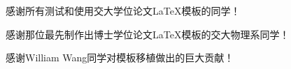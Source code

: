 
\begin{thanks}

  感谢所有测试和使用交大学位论文{\LaTeX}模板的同学！

  感谢那位最先制作出博士学位论文{\LaTeX}模板的交大物理系同学！

  感谢William Wang同学对模板移植做出的巨大贡献！

\end{thanks}
